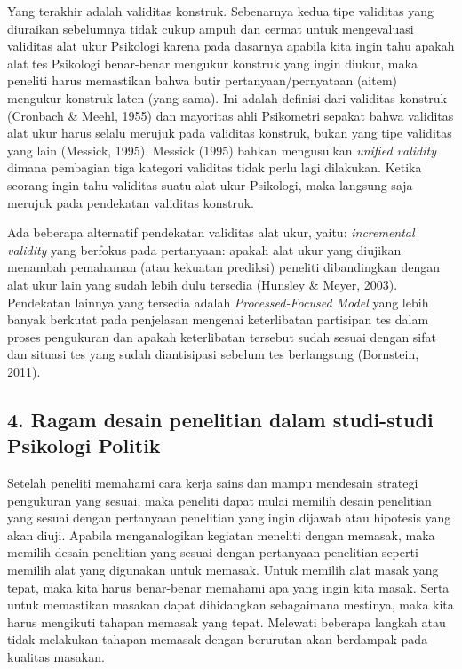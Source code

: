 \documentclass[
  english,
  man]{apa6}
\begin{document}
Yang terakhir adalah validitas konstruk. Sebenarnya kedua tipe validitas yang diuraikan sebelumnya tidak cukup ampuh dan cermat untuk mengevaluasi validitas alat ukur Psikologi karena pada dasarnya apabila kita ingin tahu apakah alat tes Psikologi benar-benar mengukur konstruk yang ingin diukur, maka peneliti harus memastikan bahwa butir pertanyaan/pernyataan (aitem) mengukur konstruk laten (yang sama). Ini adalah definisi dari validitas konstruk (Cronbach \& Meehl, 1955) dan mayoritas ahli Psikometri sepakat bahwa validitas alat ukur harus selalu merujuk pada validitas konstruk, bukan yang tipe validitas yang lain (Messick, 1995). Messick (1995) bahkan mengusulkan \emph{unified validity} dimana pembagian tiga kategori validitas tidak perlu lagi dilakukan. Ketika seorang ingin tahu validitas suatu alat ukur Psikologi, maka langsung saja merujuk pada pendekatan validitas konstruk.

Ada beberapa alternatif pendekatan validitas alat ukur, yaitu: \emph{incremental validity} yang berfokus pada pertanyaan: apakah alat ukur yang diujikan menambah pemahaman (atau kekuatan prediksi) peneliti dibandingkan dengan alat ukur lain yang sudah lebih dulu tersedia (Hunsley \& Meyer, 2003). Pendekatan lainnya yang tersedia adalah \emph{Processed-Focused Model} yang lebih banyak berkutat pada penjelasan mengenai keterlibatan partisipan tes dalam proses pengukuran dan apakah keterlibatan tersebut sudah sesuai dengan sifat dan situasi tes yang sudah diantisipasi sebelum tes berlangsung (Bornstein, 2011).

\hypertarget{ragam-desain-penelitian-dalam-studi-studi-psikologi-politik}{%
\subsection{4. Ragam desain penelitian dalam studi-studi Psikologi Politik}\label{ragam-desain-penelitian-dalam-studi-studi-psikologi-politik}}

Setelah peneliti memahami cara kerja sains dan mampu mendesain strategi pengukuran yang sesuai, maka peneliti dapat mulai memilih desain penelitian yang sesuai dengan pertanyaan penelitian yang ingin dijawab atau hipotesis yang akan diuji. Apabila menganalogikan kegiatan meneliti dengan memasak, maka memilih desain penelitian yang sesuai dengan pertanyaan penelitian seperti memilih alat yang digunakan untuk memasak. Untuk memilih alat masak yang tepat, maka kita harus benar-benar memahami apa yang ingin kita masak. Serta untuk memastikan masakan dapat dihidangkan sebagaimana mestinya, maka kita harus mengikuti tahapan memasak yang tepat. Melewati beberapa langkah atau tidak melakukan tahapan memasak dengan berurutan akan berdampak pada kualitas masakan.
\end{document}
